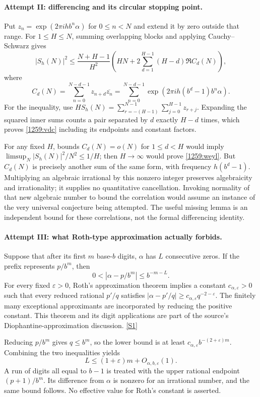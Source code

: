 \documentclass[11pt,a4paper]{article}
\newcommand{\sref}[2]{\hyperlink{source:#1:#2}{[S#2]}}
\numberwithin{equation}{section}
\begin{document}
\paragraph{Attempt II: differencing and its circular stopping point.}
Put $z_n=\exp(2\pi i h b^n\alpha)$ for $0\leq n<N$ and extend it by
zero outside that range.  For $1\leq H\leq N$, summing overlapping
blocks and applying Cauchy--Schwarz gives
\begin{equation}\label{1259:vdc}
 |S_h(N)|^2\leq\frac{N+H-1}{H^2}
 \left(HN+2\sum_{d=1}^{H-1}(H-d)\Re C_d(N)\right),
\end{equation}
where
\[
 C_d(N)=\sum_{n=0}^{N-d-1}z_{n+d}\overline{z_n}
       =\sum_{n=0}^{N-d-1}
           \exp(2\pi i h(b^d-1)b^n\alpha).
\]
For the inequality, use
$HS_h(N)=\sum_{r=-(H-1)}^{N-1}\sum_{j=0}^{H-1}z_{r+j}$.
Expanding the squared inner sums counts a pair separated by $d$
exactly $H-d$ times, which proves \eqref{1259:vdc} including its
endpoints and constant factors.

For any fixed $H$, bounds $C_d(N)=o(N)$ for $1\leq d<H$ would imply
$\limsup_N|S_h(N)|^2/N^2\leq1/H$; then $H\to\infty$ would prove
\eqref{1259:weyl}.  But $C_d(N)$ is precisely another sum of the same
form, with frequency $h(b^d-1)$.  Multiplying an algebraic irrational
by this nonzero integer preserves algebraicity and irrationality;
it supplies no quantitative cancellation.  Invoking normality of
that new algebraic number to bound the correlation would assume an
instance of the very universal conjecture being attempted.  The
useful missing lemma is an independent bound for these correlations,
not the formal differencing identity.

\paragraph{Attempt III: what Roth-type approximation actually forbids.}
Suppose that after its first $m$ base-$b$ digits, $\alpha$ has $L$
consecutive zeros.  If the prefix represents $p/b^m$, then
\[
 0<|\alpha-p/b^m|\leq b^{-m-L}.
\]
For every fixed $\varepsilon>0$, Roth's approximation theorem implies
a constant $c_{\alpha,\varepsilon}>0$ such that every reduced rational
$p'/q$ satisfies
$|\alpha-p'/q|\geq c_{\alpha,\varepsilon}q^{-2-\varepsilon}$.
The finitely many exceptional approximants are incorporated by reducing
the positive constant.  This theorem and its digit applications are
part of the source's Diophantine-approximation discussion.
\sref{1259}{1}

Reducing $p/b^m$ gives $q\leq b^m$, so the lower bound is at least
$c_{\alpha,\varepsilon}b^{-(2+\varepsilon)m}$.  Combining the two
inequalities yields
\begin{equation}\label{1259:runs}
 L\leq(1+\varepsilon)m+O_{\alpha,b,\varepsilon}(1).
\end{equation}
A run of digits all equal to $b-1$ is treated with the upper rational
endpoint $(p+1)/b^m$.  Its difference from $\alpha$ is nonzero for
an irrational number, and the same bound follows.  No effective value
for Roth's constant is asserted.
\end{document}
